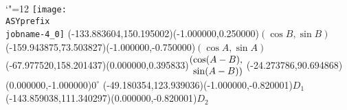 \setlength{\unitlength}{1pt}%
\makeatletter%
\let\ASYencoding\f@encoding%
\let\ASYfamily\f@family%
\let\ASYseries\f@series%
\let\ASYshape\f@shape%
\makeatother%
{\catcode`"=12%
\texttt{[image: \\ASYprefix\\jobname-4\_0]}%
}%
\color{ASYcolor}%
\fontsize{12.000000}{14.400000}\selectfont%
\usefont{\ASYencoding}{\ASYfamily}{\ASYseries}{\ASYshape}%
\ASYalign(-133.883604,150.195002)(-1.000000,0.250000){$(\cos B, \sin B)$}%
\color{ASYcolor}%
\fontsize{12.000000}{14.400000}\selectfont%
\ASYalign(-159.943875,73.503827)(-1.000000,-0.750000){$(\cos A, \sin A)$}%
\color{ASYcolor}%
\fontsize{12.000000}{14.400000}\selectfont%
\ASYalign(-67.977520,158.201437)(0.000000,0.395833){$\arraycolsep=0pt \begin{array}{rl} (& \cos (A-B), \\ & \sin (A-B)) \end{array}$}%
\color{ASYcolor}%
\fontsize{12.000000}{14.400000}\selectfont%
\ASYalign(-24.273786,90.694868)(0.000000,-1.000000){$0^\circ$}%
\color{ASYcolor}%
\fontsize{12.000000}{14.400000}\selectfont%
\ASYalign(-49.180354,123.939036)(-1.000000,-0.820001){$D_1$}%
\color{ASYcolor}%
\fontsize{12.000000}{14.400000}\selectfont%
\ASYalign(-143.859038,111.340297)(0.000000,-0.820001){$D_2$}%
